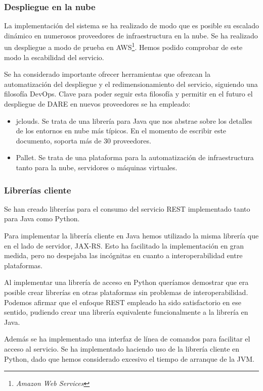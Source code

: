 \subsubsection{Despliegue en la nube}
La implementación del sistema se ha realizado de modo que es posible
su escalado dinámico en numerosos proveedores de infraestructura en la
nube. Se ha realizado un despliegue a modo de prueba en
AWS\footnote{\emph{Amazon Web Services}}. Hemos podido comprobar de
este modo la escabilidad del servicio.

Se ha considerado importante ofrecer herramientas que ofrezcan la
automatización del despliegue y el redimensionamiento del servicio,
siguiendo una filosofía DevOps\cite{DEVOPS}. Clave para poder seguir
esta filosofía y permitir en el futuro el despliegue de DARE en nuevos
proveedores se ha empleado:

\begin{itemize}
  \item jclouds\cite{JCLOUDS}. Se trata de una librería para Java que nos abstrae
    sobre los detalles de los entornos en nube más típicos. En el
    momento de escribir este documento, soporta más de 30 proveedores.
  \item Pallet\cite{PALLET}. Se trata de una plataforma para la
    automatización de infraestructura tanto para la nube, servidores o
    máquinas virtuales.
\end{itemize}

\subsubsection{Librerías cliente}

Se han creado librerías para el consumo del servicio REST implementado
tanto para Java como Python.

Para implementar la librería cliente en Java hemos utilizado la misma
librería que en el lado de servidor, JAX-RS. Esto ha facilitado la
implementación en gran medida, pero no despejaba las incógnitas en
cuanto a interoperabilidad entre plataformas.

Al implementar una librería de acceso en Python queríamos demostrar
que era posible crear librerías en otras plataformas sin problemas de
interoperabilidad. Podemos afirmar que el enfoque REST empleado ha
sido satisfactorio en ese sentido, pudiendo crear una librería
equivalente funcionalmente a la librería en Java.

Además se ha implementado una interfaz de línea de comandos para
facilitar el acceso al servicio. Se ha implementado haciendo uso de la
librería cliente en Python, dado que hemos considerado excesivo el
tiempo de arranque de la JVM.

